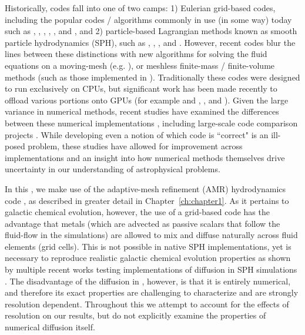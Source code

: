 Historically, codes fall into one of two camps: 1) Eulerian grid-based codes, including the popular codes / algorithms commonly in use (in some way) today such as  \citep{StoneNorman1992},  \citep{FLASH},  \citep{Teyssier2002},  \citep{Athena},  \citep{Rudd2008}, and  \citep{Enzo2014}, and 2) particle-based Lagrangian methods known as smooth particle hydrodynamics (SPH), such as  \citep{Springel2005},  \citep{Stadel2001},  \citep{Wadsley2004}, and  \citep{Menon2015}. However, recent codes blur the lines between these distinctions with new algorithms for solving the fluid equations on a moving-mesh (e.g.  \citep{Springel2010}), or meshless finite-mass / finite-volume methods (such as those implemented in  \citep{Hopkins2015}). Traditionally these codes were designed to run exclusively on CPUs, but significant work has been made recently to offload various portions onto GPUs (for example  and  \citep{Schive2010,Schive2018},  , and  \citep{Schneider2015}). Given the large variance in numerical methods, recent studies have examined the differences between these numerical implementations \citep[e.g.][]{Agertz2007}, including large-scale code comparison projects \citep[e.g.][]{AGORA,AGORA2}. While developing even a notion of which code is ``correct" is an ill-posed problem, these studies have allowed for improvement across implementations and an insight into how numerical methods themselves drive uncertainty in our understanding of astrophysical problems.

In this \dissertation, we make use of the adaptive-mesh refinement (AMR) hydrodynamics code , as described in greater detail in Chapter~\ref{ch:chapter1}. As it pertains to galactic chemical evolution, however, the use of a grid-based code has the advantage that metals (which are advected as passive scalars that follow the fluid-flow in the simulations) are allowed to mix and diffuse naturally across fluid elements (grid cells). This is not possible in native SPH implementations, yet is necessary to reproduce realistic galactic chemical evolution properties as shown by multiple recent works testing implementations of diffusion in SPH simulations \citep[e.g.][]{Shen2010,Su2017a,Escala2018}. The disadvantage of the diffusion in , however, is that it is entirely numerical, and therefore its exact properties are challenging to characterize and are strongly resolution dependent. Throughout this \dissertation we attempt to account for the effects of resolution on our results, but do not explicitly examine the properties of numerical diffusion itself.


